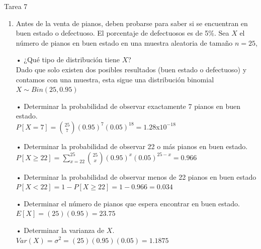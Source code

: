 \documentclass[a4paper, 12pt]{article}
\newcommand{\Aspace}{0.2cm}
\begin{document}
\newpage
\begin{center}
    { \LARGE Tarea 7}
\end{center}

\begin{enumerate}
    \item Antes de la venta de pianos, deben probarse para saber si se encuentran en buen estado o defectuoso. El porcentaje de defectuosos es de 5\%. Sea $X$ el número de pianos en buen estado en una muestra aleatoria de tamaño $n = 25$,
    \vspace{\Aspace} \par
    • ¿Qué tipo de distribución tiene $X$?
    \\ { \color{azul} Dado que solo existen dos posibles resultados (buen estado o defectuoso) y contamos con una muestra, esta sigue una distribución binomial $X \sim Bin(25, 0{.}95)$ }

    \vspace{\Aspace} \par
    • Determinar la probabilidad de observar exactamente 7 pianos en buen estado.
    \\ { \color{azul} $P[X = 7] = \binom{25}{7} (0{.}95)^{7} (0{.}05)^{18} = 1{.}28$x$10^{-18}$ }

    \vspace{\Aspace} \par
    • Determinar la probabilidad de observar 22 o más pianos en buen estado.
    \\ { \color{azul} $P[X \geq 22] = \sum\limits_{x = 22}^{25} \binom{25}{x} (0{.}95)^{x} (0{.}05)^{25 - x} = 0{.}966$ }

    \vspace{\Aspace} \par
    • Determinar la probabilidad de observar menos de 22 pianos en buen estado
    \\ { \color{azul} $P[X < 22] = 1 - P[X \geq 22] = 1 - 0{.}966 = 0{.}034$ }

    \vspace{\Aspace} \par
    • Determinar el número de pianos que espera encontrar en buen estado.
    \\ { \color{azul} $E[X] = (25)(0{.}95) = 23{.}75$ }

    \vspace{\Aspace} \par
    • Determinar la varianza de $X$.
    \\ { \color{azul} $Var(X) = \sigma^{2} = (25)(0{.}95)(0{.}05) = 1{.}1875$ }



\end{enumerate}
\end{document}
